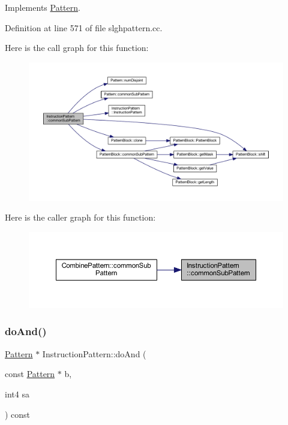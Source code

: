 Implements \mbox{\hyperlink{class_pattern_a54daed6fc84146ad309a25dfa8a68052}{Pattern}}.



Definition at line 571 of file slghpattern.\+cc.

Here is the call graph for this function\+:
\nopagebreak
\begin{figure}[H]
\begin{center}
\leavevmode
\includegraphics[width=350pt]{class_instruction_pattern_a22b45bc904929f0f094a0a64174bb70c_cgraph}
\end{center}
\end{figure}
Here is the caller graph for this function\+:
\nopagebreak
\begin{figure}[H]
\begin{center}
\leavevmode
\includegraphics[width=350pt]{class_instruction_pattern_a22b45bc904929f0f094a0a64174bb70c_icgraph}
\end{center}
\end{figure}
\mbox{\label{class_instruction_pattern_ac56875a4e5fca7c5a3ea2a92a3afc47b}} 
\subsubsection{\texorpdfstring{doAnd()}{doAnd()}}
{\footnotesize\ttfamily \mbox{\hyperlink{class_pattern}{Pattern}} $\ast$ Instruction\+Pattern\+::do\+And (\begin{DoxyParamCaption}\item[{const \mbox{\hyperlink{class_pattern}{Pattern}} $\ast$}]{b,  }\item[{int4}]{sa }\end{DoxyParamCaption}) const\hspace{0.3cm}{\ttfamily [virtual]}}



